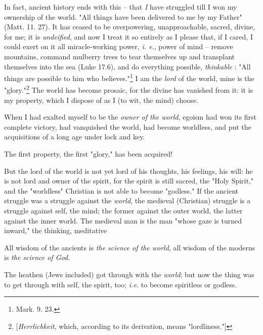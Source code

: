 \documentclass[a4paper]{book}
\begin{document}
In fact, ancient history ends with this -- that \textit{I} have struggled till 
I won my ownership of the world. "{}All things have been delivered to me by my 
Father"{} (Matt. 11. 27). It has ceased to be overpowering, unapproachable, 
sacred, divine, for me; it is \textit{undeified}, and now I treat it so 
entirely as I please that, if I cared, I could exert on it all miracle-working 
power, \textit{i. e.}, power of mind -- remove mountains, command mulberry 
trees to tear themselves up and transplant themselves into the sea (Luke 
17.6), and do everything possible, \textit{thinkable} : "{}All things are 
possible to him who believes."{}\footnote{Mark. 9. 23.} I am the \textit{lord} 
of the world, mine is the "{}glory."{}\footnote{[\textit{Herrlichkeit}, which, 
according to its derivation, means "{}lordliness."{}]} The world has become 
prosaic, for the divine has vanished from it: it is my property, which I 
dispose of as I (to wit, the mind) choose.

When I had exalted myself to be the \textit{owner of the world}, egoism had 
won its first complete victory, had vanquished the world, had become 
worldless, and put the acquisitions of a long age under lock and key.

The first property, the first "{}glory,"{} has been acquired!

But the lord of the world is not yet lord of his thoughts, his feelings, his 
will: he is not lord and owner of the spirit, for the spirit is still sacred, 
the "{}Holy Spirit,"{} and the "{}worldless"{} Christian is not able to become 
"{}godless."{} If the ancient struggle was a struggle against the 
\textit{world}, the medieval (Christian) struggle is a struggle against self, 
the mind; the former against the outer world, the latter against the inner 
world. The medieval man is the man "{}whose gaze is turned inward,"{} the 
thinking, meditative

All wisdom of the ancients is \textit{the science of the world}, all wisdom of 
the moderns is \textit{the science of God}.

The heathen (Jews included) got through with the \textit{world}; but now the 
thing was to get through with self, the spirit, too; \textit{i.e.} to become 
spiritless or godless.
\end{document}
